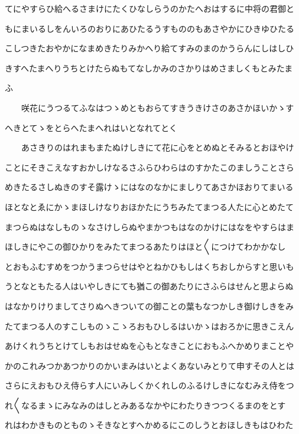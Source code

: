 \documentclass[a4paper,11pt,landscape]{ltjtarticle}
\begin{document}
\par\medskip
てにやすらひ給へるさまけにたくひなしらうのかたへおはするに中将の君御と
\par\medskip
もにまいるしをんいろのおりにあひたるうすもののもあさやかにひきゆひたる
\par\medskip
こしつきたおやかになまめきたりみかへり給てすみのまのかうらんにしはしひ
\par\medskip
きすへたまへりうちとけたらぬもてなしかみのさかりはめさましくもとみたま
\par\medskip
ふ
\par\medskip
　　咲花にうつるてふなはつゝめともおらてすきうきけさのあさかほいかゝす
\par\medskip
へきとてゝをとらへたまへれはいとなれてとく
\par\medskip
　　あさきりのはれまもまたぬけしきにて花に心をとめぬとそみるとおほやけ
\par\medskip
ことにそきこえなすおかしけなるさふらひわらはのすかたこのましうことさら
\par\medskip
めきたるさしぬきのすそ露けゝにはなのなかにましりてあさかほおりてまいる
\par\medskip
ほとなとゑにかゝまほしけなりおほかたにうちみたてまつる人たに心とめたて
\par\medskip
まつらぬはなしものゝなさけしらぬやまかつもはなのかけにはなをやすらはま
\par\medskip
ほしきにやこの御ひかりをみたてまつるあたりはほと〱につけてわかかなし
\par\medskip
とおもふむすめをつかうまつらせはやとねかひもしはくちおしからすと思いも
\par\medskip
うとなともたる人はいやしきにても猶この御あたりにさふらはせんと思よらぬ
\par\medskip
はなかりけりましてさりぬへきついての御ことの葉もなつかしき御けしきをみ
\par\medskip
たてまつる人のすこしものゝこゝろおもひしるはいかゝはおろかに思きこえん
\par\medskip
あけくれうちとけてしもおはせぬを心もとなきことにおもふへかめりまことや
\par\medskip
かのこれみつかあつかりのかいまみはいとよくあないみとりて申すその人とは
\par\medskip
さらにえおもひえ侍らす人にいみしくかくれしのふるけしきになむみえ侍をつ
\par\medskip
れ〱なるまゝにみなみのはしとみあるなかやにわたりきつつくるまのをとす
\par\medskip
れはわかきものとものゝそきなとすへかめるにこのしうとおほしきもはひわた
\end{document}
